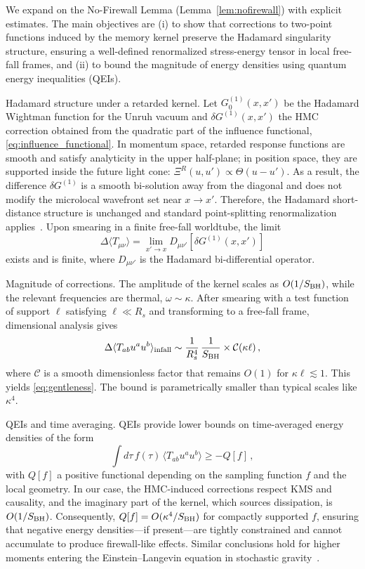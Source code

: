 \documentclass[11pt,a4paper]{article}
\newcommand{\HMC}{\textsc{HMC}\xspace}
\theoremstyle{plain}
\theoremstyle{definition}
\theoremstyle{remark}
\begin{document}
We expand on the No-Firewall Lemma (Lemma~\ref{lem:nofirewall}) with explicit estimates. The main objectives are (i) to show that corrections to two-point functions induced by the memory kernel preserve the Hadamard singularity structure, ensuring a well-defined renormalized stress-energy tensor in local free-fall frames, and (ii) to bound the magnitude of energy densities using quantum energy inequalities (QEIs).

Hadamard structure under a retarded kernel. Let $G^{(1)}_0(x,x')$ be the Hadamard Wightman function for the Unruh vacuum and $\delta G^{(1)}(x,x')$ the \HMC{} correction obtained from the quadratic part of the influence functional, \eqref{eq:influence_functional}. In momentum space, retarded response functions are smooth and satisfy analyticity in the upper half-plane; in position space, they are supported inside the future light cone: $\Xi^R(u,u')\propto \Theta(u-u')$. As a result, the difference $\delta G^{(1)}$ is a smooth bi-solution away from the diagonal and does not modify the microlocal wavefront set near $x\to x'$. Therefore, the Hadamard short-distance structure is unchanged and standard point-splitting renormalization applies~\cite{Radzikowski:1996}. Upon smearing in a finite free-fall worldtube, the limit
\begin{equation}
\Delta\langle T_{\mu\nu}\rangle = \lim_{x'\to x} D_{\mu\nu'}\left[\delta G^{(1)}(x,x')\right]
\end{equation}
exists and is finite, where $D_{\mu\nu'}$ is the Hadamard bi-differential operator.

Magnitude of corrections. The amplitude of the kernel scales as $O(1/S_{\rm BH})$, while the relevant frequencies are thermal, $\omega\sim \kappa$. After smearing with a test function of support $\ell$ satisfying $\ell\ll R_s$ and transforming to a free-fall frame, dimensional analysis gives
\begin{equation}
\Delta\langle T_{ab}u^a u^b\rangle_{\rm infall} \sim \frac{1}{R_s^4}\,\frac{1}{S_{\rm BH}}\times \mathcal{C}(\kappa \ell)\,,
\end{equation}
where $\mathcal{C}$ is a smooth dimensionless factor that remains $O(1)$ for $\kappa\ell\lesssim 1$. This yields \eqref{eq:gentleness}. The bound is parametrically smaller than typical scales like $\kappa^4$.

QEIs and time averaging. QEIs provide lower bounds on time-averaged energy densities of the form
\begin{equation}
\int d\tau\, f(\tau)\,\langle T_{ab}u^a u^b\rangle \ge - Q[f]\,,
\end{equation}
with $Q[f]$ a positive functional depending on the sampling function $f$ and the local geometry. In our case, the \HMC{}-induced corrections respect KMS and causality, and the imaginary part of the kernel, which sources dissipation, is $O(1/S_{\rm BH})$. Consequently, $Q[f]=O(\kappa^4/S_{\rm BH})$ for compactly supported $f$, ensuring that negative energy densities---if present---are tightly constrained and cannot accumulate to produce firewall-like effects. Similar conclusions hold for higher moments entering the Einstein--Langevin equation in stochastic gravity~\cite{HuVerdaguer:2008}.
\end{document}
